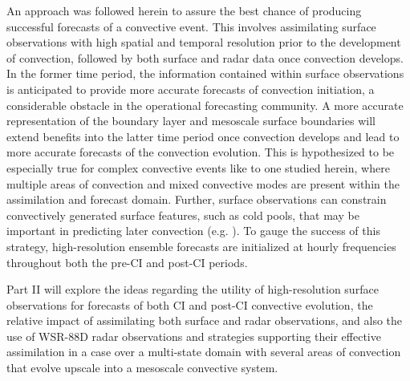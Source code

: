 An approach was followed herein to assure the best chance of producing successful forecasts of a convective event. This involves assimilating surface observations with high spatial and temporal resolution prior to the development of convection, followed by both surface and radar data once convection develops. In the former time period, the information contained within surface observations is anticipated to provide more accurate forecasts of convection initiation, a considerable obstacle in the operational forecasting community. A more accurate representation of the boundary layer and mesoscale surface boundaries will extend benefits into the latter time period once convection develops and lead to more accurate forecasts of the convection evolution. This is hypothesized to be especially true for complex convective events like to one studied herein, where multiple areas of convection and mixed convective modes are present within the assimilation and forecast domain. Further, surface observations can constrain convectively generated surface features, such as cold pools, that may be important in predicting later convection (e.g. \citealt{stensrudetal09}). To gauge the success of this strategy, high-resolution ensemble forecasts are initialized at hourly frequencies throughout both the pre-CI and post-CI periods.

Part II will explore the ideas regarding the utility of high-resolution surface observations for forecasts of both CI and post-CI convective evolution, the relative impact of assimilating both surface and radar observations, and also the use of WSR-88D radar observations and strategies supporting their effective assimilation in a case over a multi-state domain with several areas of convection that evolve upscale into a mesoscale convective system.
